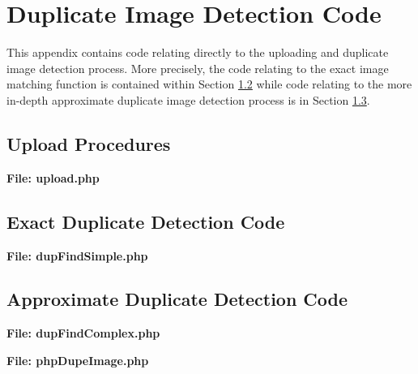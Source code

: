 %
%
  
\chapter{Duplicate Image Detection Code}\label{appa:didcode}
This appendix contains code relating directly to the uploading and duplicate image detection process. More precisely, the code relating to the exact image matching function is contained within Section \ref{appa:exact} while code relating to the more in-depth approximate duplicate image detection process is in Section \ref{appa:approx}.

\section{Upload Procedures}\label{appa:upload}
\textbf{File: upload.php}

\newpage

\section{Exact Duplicate Detection Code}\label{appa:exact}
\textbf{File: dupFindSimple.php}

\newpage

\section{Approximate Duplicate Detection Code}\label{appa:approx}
\textbf{File: dupFindComplex.php}

\newpage
\textbf{File: phpDupeImage.php}

\newpage

